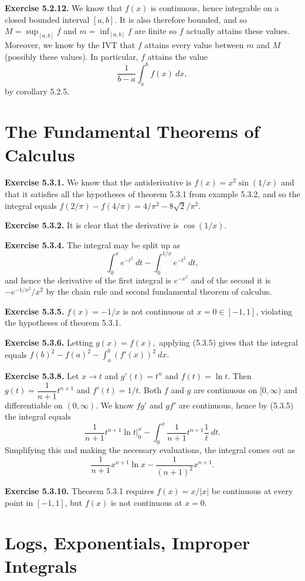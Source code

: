 \documentclass[12pt]{book}
\newcommand{\prb}[1]{\textbf{Exercise #1.}}
\begin{document}
\prb{5.2.12} We know that $f(x)$ is continuous, hence integrable on a closed bounded interval $[a,b]$. It is also therefore bounded, and so $M = \sup_{[a,b]} f$ and $m = \inf_{[a,b]} f$ are finite so $f$ actually attains these values. Moreover, we know by the IVT that $f$ attains every value between $m$ and $M$ (possibly these values). In particular, $f$ attains the value $$\dfrac{1}{b-a} \int_a^b f(x) \ dx,$$ by corollary 5.2.5.

\section{The Fundamental Theorems of Calculus}

\prb{5.3.1} We know that the antiderivative is $f(x) = x^2 \sin(1/x)$ and that it satisfies all the hypotheses of theorem 5.3.1 from example 5.3.2, and so the integral equals $f(2/\pi) - f(4/\pi) = 4/\pi^2 - 8\sqrt{2}/\pi^2.$

\prb{5.3.2} It is clear that the derivative is $\cos (1/x).$

\prb{5.3.4} The integral may be split up as $$\int_0^x e^{-t^2} \ dt - \int_0^{1/x} e^{-t^2} \ dt,$$ and hence the derivative of the first integral is $e^{-x^2}$ and of the second it is $-e^{-1/x^2}/x^2$ by the chain rule and second fundamental theorem of calculus.

\prb{5.3.5} $f(x) = -1/x$ is not continuous at $x = 0 \in [-1, 1]$, violating the hypotheses of theorem 5.3.1.

\prb{5.3.6} Letting $g(x) = f(x),$ applying (5.3.5) gives that the integral equals $f(b)^2 - f(a)^2 - \displaystyle \int_a^b (f'(x))^2 \ dx.$

\prb{5.3.8} Let $x \rightarrow t$ and $g'(t) = t^n$ and $f(t) = \ln t$. Then $g(t) = \dfrac{1}{n+1} t^{n+1}$ and $f'(t) = 1/t$. Both $f$ and $g$ are continuous on $[0, \infty)$ and differentiable on $(0, \infty)$. We know $fg'$ and $gf'$ are continuous, hence by (5.3.5) the integral equals $$\dfrac{1}{n+1} t^{n+1} \ln t \bigg|_0^x - \int_0^x \dfrac{1}{n+1} t^{n+1} \dfrac{1}{t} \ dt.$$ Simplifying this and making the necessary evaluations, the integral comes out as $$\dfrac{1}{n+1} x^{n+1} \ln x - \dfrac{1}{(n+1)^2} x^{n+1}.$$

\prb{5.3.10} Theorem 5.3.1 requires $f(x) = x/|x|$ be continuous at every point in $[-1, 1]$, but $f(x)$ is not continuous at $x = 0.$


\section{Logs, Exponentials, Improper Integrals}
\end{document}
